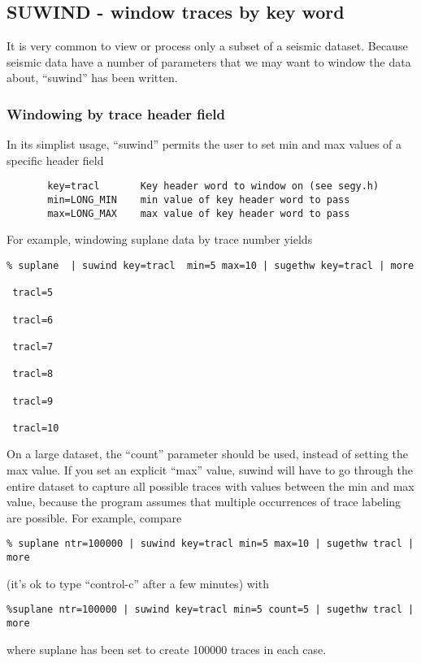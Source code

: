 {{{{{{{\subsection{SUWIND - window traces by key word}

It is very common to view or process only a subset of a
seismic dataset. Because seismic data have a number of parameters
that we may want to window the data about, ``suwind'' has been
written.

\subsubsection{Windowing by trace header field}
In its simplist usage, ``suwind'' permits the user to set
min and max values of a specific header field 
{\small \begin{verbatim}
       key=tracl       Key header word to window on (see segy.h)       
       min=LONG_MIN    min value of key header word to pass            
       max=LONG_MAX    max value of key header word to pass            
\end{verbatim}}\noindent

For example, windowing suplane data by trace number yields
{\small \begin{verbatim}
% suplane  | suwind key=tracl  min=5 max=10 | sugethw key=tracl | more

 tracl=5

 tracl=6

 tracl=7

 tracl=8

 tracl=9

 tracl=10   
\end{verbatim}}\noindent
On a large dataset, the ``count'' parameter should be used,
instead of setting the max value. If you set an explicit
``max'' value, suwind will have to go through the entire
dataset to capture all possible traces with values between
the min and max value, because the program assumes that multiple
occurrences of trace labeling are possible.
For example, compare
{\small \begin{verbatim}
% suplane ntr=100000 | suwind key=tracl min=5 max=10 | sugethw tracl | more
\end{verbatim}}\noindent
(it's ok to type ``control-c'' after a few minutes) with
{\small \begin{verbatim}
%suplane ntr=100000 | suwind key=tracl min=5 count=5 | sugethw tracl | more                                                               
\end{verbatim}}\noindent
where suplane has been set to create 100000 traces in each case.

}}}}}}}
